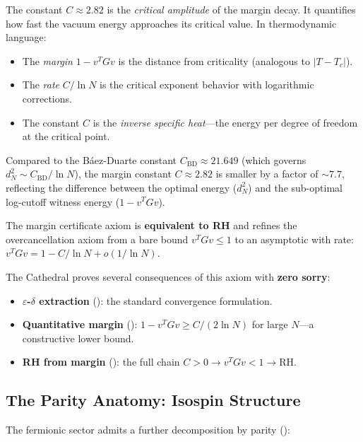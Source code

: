 \begin{correspondence}
The constant $C \approx 2.82$ is the \emph{critical amplitude} of
the margin decay. It quantifies how fast the vacuum energy
approaches its critical value. In thermodynamic language:
\begin{itemize}
  \item The \emph{margin} $1 - v^T G v$ is the distance from
    criticality (analogous to $|T - T_c|$).
  \item The \emph{rate} $C / \ln N$ is the critical exponent
    behavior with logarithmic corrections.
  \item The constant $C$ is the \emph{inverse specific heat}---the
    energy per degree of freedom at the critical point.
\end{itemize}
Compared to the B\'aez-Duarte constant $C_{\mathrm{BD}} \approx 21.649$
(which governs $d_N^2 \sim C_{\mathrm{BD}}/\ln N$), the margin
constant $C \approx 2.82$ is smaller by a factor of $\sim 7.7$,
reflecting the difference between the optimal energy ($d_N^2$) and
the sub-optimal log-cutoff witness energy ($1 - v^T G v$).

The margin certificate axiom is \textbf{equivalent to RH}
and refines the overcancellation axiom from a bare bound
$v^T G v \leq 1$ to an asymptotic with rate:
$v^T G v = 1 - C/\ln N + o(1/\ln N)$.
\end{correspondence}

The Cathedral proves several consequences of this axiom with
\textbf{zero sorry}:
\begin{itemize}
  \item \textbf{$\varepsilon$-$\delta$ extraction}
    (): the standard convergence formulation.
  \item \textbf{Quantitative margin}
    (): $1 - v^T G v \geq C/(2\ln N)$
    for large $N$---a constructive lower bound.
  \item \textbf{RH from margin}
    (): the full chain
    $C > 0 \to v^T G v < 1 \to \text{RH}$.
\end{itemize}

\subsection{The Parity Anatomy: Isospin Structure}

The fermionic sector admits a further decomposition by parity
():

